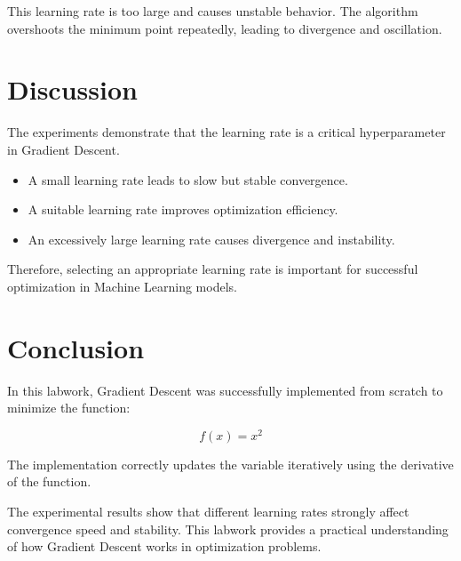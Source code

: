 \documentclass[12pt]{article}
\begin{document}
This learning rate is too large and causes unstable behavior. 
The algorithm overshoots the minimum point repeatedly, leading to divergence and oscillation.

\section{Discussion}

The experiments demonstrate that the learning rate is a critical hyperparameter in Gradient Descent.

\begin{itemize}
    \item A small learning rate leads to slow but stable convergence.
    \item A suitable learning rate improves optimization efficiency.
    \item An excessively large learning rate causes divergence and instability.
\end{itemize}

Therefore, selecting an appropriate learning rate is important for successful optimization in Machine Learning models.

\section{Conclusion}

In this labwork, Gradient Descent was successfully implemented from scratch to minimize the function:

\[
f(x) = x^2
\]

The implementation correctly updates the variable iteratively using the derivative of the function.

The experimental results show that different learning rates strongly affect convergence speed and stability. 
This labwork provides a practical understanding of how Gradient Descent works in optimization problems.
\end{document}
